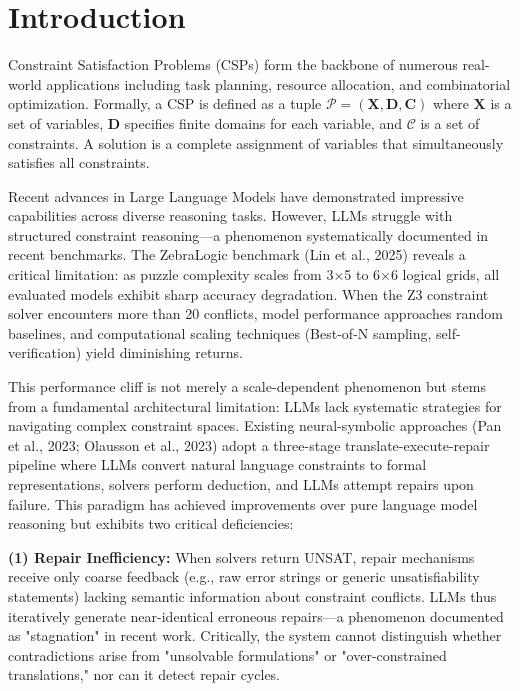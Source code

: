 \documentclass[letterpaper]{article}
\begin{document}

\section{Introduction}

Constraint Satisfaction Problems (CSPs) form the backbone of numerous real-world applications including task planning, resource allocation, and combinatorial optimization. Formally, a CSP is defined as a tuple $\mathcal{P} = (\mathbf{X}, \mathbf{D}, \mathbf{C})$ where $\mathbf{X}$ is a set of variables, $\mathbf{D}$ specifies finite domains for each variable, and $\mathcal{C}$ is a set of constraints. A solution is a complete assignment of variables that simultaneously satisfies all constraints.

Recent advances in Large Language Models have demonstrated impressive capabilities across diverse reasoning tasks. However, LLMs struggle with structured constraint reasoning—a phenomenon systematically documented in recent benchmarks. The ZebraLogic benchmark (Lin et al., 2025) reveals a critical limitation: as puzzle complexity scales from 3×5 to 6×6 logical grids, all evaluated models exhibit sharp accuracy degradation. When the Z3 constraint solver encounters more than 20 conflicts, model performance approaches random baselines, and computational scaling techniques (Best-of-N sampling, self-verification) yield diminishing returns.

This performance cliff is not merely a scale-dependent phenomenon but stems from a fundamental architectural limitation: LLMs lack systematic strategies for navigating complex constraint spaces. Existing neural-symbolic approaches (Pan et al., 2023; Olausson et al., 2023) adopt a three-stage translate-execute-repair pipeline where LLMs convert natural language constraints to formal representations, solvers perform deduction, and LLMs attempt repairs upon failure. This paradigm has achieved improvements over pure language model reasoning but exhibits two critical deficiencies:

\textbf{(1) Repair Inefficiency:} When solvers return UNSAT, repair mechanisms receive only coarse feedback (e.g., raw error strings or generic unsatisfiability statements) lacking semantic information about constraint conflicts. LLMs thus iteratively generate near-identical erroneous repairs—a phenomenon documented as "stagnation" in recent work. Critically, the system cannot distinguish whether contradictions arise from "unsolvable formulations" or "over-constrained translations," nor can it detect repair cycles.
\end{document}
